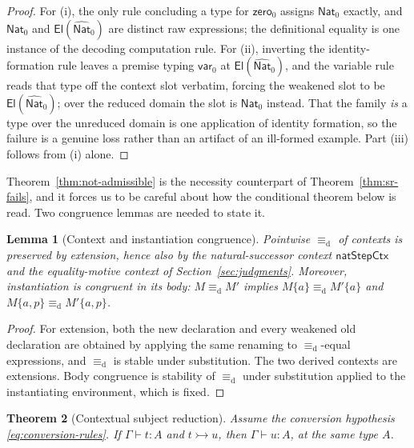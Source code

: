 \documentclass[10pt,reqno]{amsart}
\newtheorem{theorem}{Theorem}[section]
\newtheorem{lemma}[theorem]{Lemma}
\newcommand{\Var}{\mathsf{var}}
\newcommand{\NatTy}{\mathsf{Nat}}
\newcommand{\Zero}{\mathsf{zero}}
\newcommand{\CodeNat}{\widehat{\mathsf{Nat}}}
\newcommand{\El}{\mathsf{El}}
\newcommand{\defeq}{\mathrel{\equiv_{\mathrm d}}}
\newcommand{\ctxred}{\mathrel{\rightarrowtail}}
\begin{document}
\begin{proof}
For (i), the only rule concluding a type for \(\Zero_0\) assigns
\(\NatTy_0\) exactly, and \(\NatTy_0\) and \(\El(\CodeNat_0)\) are distinct raw
expressions; the definitional equality is one instance of the decoding
computation rule.  For (ii), inverting the identity-formation rule leaves a
premise typing \(\Var_0\) at \(\El(\CodeNat_0)\), and the variable rule reads
that type off the context slot verbatim, forcing the weakened slot to be
\(\El(\CodeNat_0)\); over the reduced domain the slot is \(\NatTy_0\) instead.
That the family \emph{is} a type over the unreduced domain is one application of
identity formation, so the failure is a genuine loss rather than an artifact of
an ill-formed example.  Part (iii) follows from (i) alone.
\end{proof}

Theorem~\ref{thm:not-admissible} is the necessity counterpart of
Theorem~\ref{thm:sr-fails}, and it forces us to be careful about how the
conditional theorem below is read.  Two congruence lemmas are needed to state
it.

\begin{lemma}[Context and instantiation congruence]
\label{lem:ctx-congruence}
Pointwise \(\defeq\) of contexts is preserved by extension, hence also by the
natural-successor context \(\mathsf{natStepCtx}\) and the equality-motive
context of Section~\ref{sec:judgments}.  Moreover, instantiation is congruent
in its \emph{body}: \(M\defeq M'\) implies \(M\{a\}\defeq M'\{a\}\) and
\(M\{a,p\}\defeq M'\{a,p\}\).
\end{lemma}

\begin{proof}
For extension, both the new declaration and every weakened old declaration are
obtained by applying the same renaming to \(\defeq\)-equal expressions, and
\(\defeq\) is stable under substitution.  The two derived contexts are
extensions.  Body congruence is stability of \(\defeq\) under substitution
applied to the instantiating environment, which is fixed.
\end{proof}

\begin{theorem}[Contextual subject reduction]
\label{thm:contextual-subject-reduction}
Assume the conversion hypothesis \eqref{eq:conversion-rules}.  If
\(\Gamma\vdash t:A\) and \(t\ctxred u\), then \(\Gamma\vdash u:A\), at the same
type \(A\).
\end{theorem}
\end{document}

